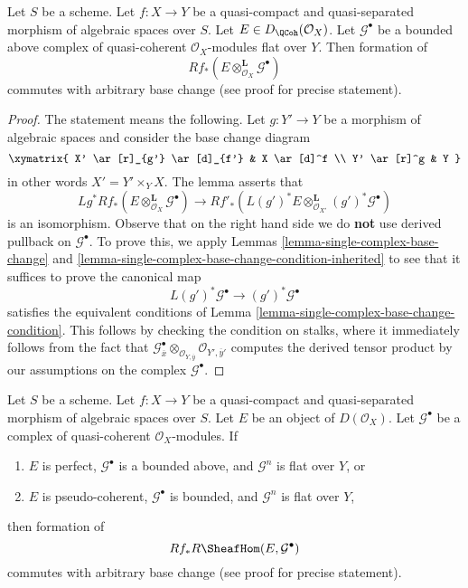 \begin{lemma}
\label{lemma-base-change-tensor}
Let $S$ be a scheme. Let $f : X \to Y$ be a quasi-compact and
quasi-separated morphism of algebraic spaces over $S$.
Let $E \in D_\QCoh(\mathcal{O}_X)$.
Let $\mathcal{G}^\bullet$ be a bounded above complex of
quasi-coherent $\mathcal{O}_X$-modules flat over $Y$.
Then formation of
$$
Rf_*(E \otimes^\mathbf{L}_{\mathcal{O}_X} \mathcal{G}^\bullet)
$$
commutes with arbitrary base change (see proof for precise statement).
\end{lemma}

\begin{proof}
The statement means the following. Let $g : Y' \to Y$ be a morphism of
algebraic spaces and consider the base change diagram
$$
\xymatrix{
X' \ar[r]_{g'} \ar[d]_{f'} &
X \ar[d]^f \\
Y' \ar[r]^g &
Y
}
$$
in other words $X' = Y' \times_Y X$. The lemma asserts that
$$
Lg^*Rf_*(E \otimes^\mathbf{L}_{\mathcal{O}_X} \mathcal{G}^\bullet)
\longrightarrow
Rf'_*(L(g')^*E \otimes^\mathbf{L}_{\mathcal{O}_{X'}} (g')^*\mathcal{G}^\bullet)
$$
is an isomorphism. Observe that on the right hand side we do {\bf not}
use derived pullback on $\mathcal{G}^\bullet$.
To prove this, we apply Lemmas \ref{lemma-single-complex-base-change} and
\ref{lemma-single-complex-base-change-condition-inherited} to see that it
suffices to prove the canonical map
$$
L(g')^*\mathcal{G}^\bullet \to (g')^*\mathcal{G}^\bullet
$$
satisfies the equivalent conditions of
Lemma \ref{lemma-single-complex-base-change-condition}.
This follows by checking the condition on stalks, where it
immediately follows from the fact that
$\mathcal{G}^\bullet_{\overline{x}}
\otimes_{\mathcal{O}_{Y, \overline{y}}}
\mathcal{O}_{Y', \overline{y}'}$
computes the derived tensor product by our assumptions on the complex
$\mathcal{G}^\bullet$.
\end{proof}

\begin{lemma}
\label{lemma-base-change-RHom}
Let $S$ be a scheme. Let $f : X \to Y$ be a quasi-compact and
quasi-separated morphism of algebraic spaces over $S$. Let $E$
be an object of $D(\mathcal{O}_X)$. Let $\mathcal{G}^\bullet$
be a complex of quasi-coherent $\mathcal{O}_X$-modules. If
\begin{enumerate}
\item $E$ is perfect, $\mathcal{G}^\bullet$ is a bounded above,
and $\mathcal{G}^n$ is flat over $Y$, or
\item $E$ is pseudo-coherent, $\mathcal{G}^\bullet$ is bounded,
and $\mathcal{G}^n$ is flat over $Y$,
\end{enumerate}
then formation of
$$
Rf_*R\SheafHom(E, \mathcal{G}^\bullet)
$$
commutes with arbitrary base change (see proof for precise statement).
\end{lemma}

